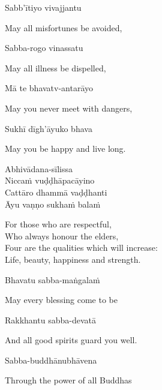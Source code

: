 
Sabb'ītiyo vivajjantu

\begin{cprenglish}
  May all misfortunes be avoided,
\end{cprenglish}

Sabba-rogo vinassatu

\begin{cprenglish}
  May all illness be dispelled,
\end{cprenglish}

Mā te bhavatv-antarāyo

\begin{cprenglish}
  May you never meet with dangers,
\end{cprenglish}

Sukhī dīgh'āyuko bhava

\begin{cprenglish}
  May you be happy and live long.
\end{cprenglish}

Abhivādana-sīlissa\\
Niccaṁ vuḍḍhāpacāyino\\
Cattāro dhammā vaḍḍhanti\\
Āyu vaṇṇo sukhaṁ balaṁ

\begin{cprenglish}
  For those who are respectful,\\
  Who always honour the elders,\\
  Four are the qualities which will increase:\\
  Life, beauty, happiness and strength. 
\end{cprenglish}


Bhavatu sabba-maṅgalaṁ

\begin{cprenglish}
  May every blessing come to be
\end{cprenglish}

Rakkhantu sabba-devatā

\begin{cprenglish}
  And all good spirits guard you well.
\end{cprenglish}

Sabba-buddhānubhāvena

\begin{cprenglish}
  Through the power of all Buddhas
\end{cprenglish}

